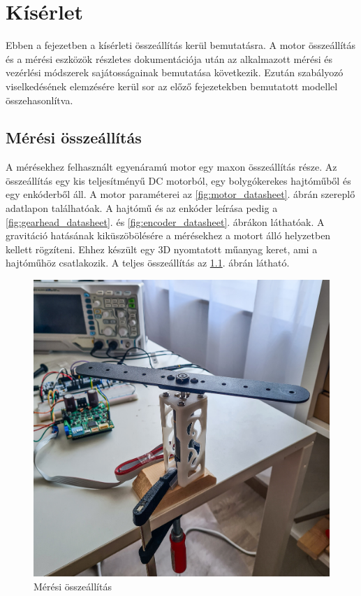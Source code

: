 \chapter{Kísérlet}\label{chap:experiment}

Ebben a fejezetben a kísérleti összeállítás kerül bemutatásra. A motor összeállítás és a mérési eszközök 
részletes dokumentációja után az alkalmazott mérési és vezérlési módszerek sajátosságainak bemutatása 
következik. Ezután szabályozó viselkedésének elemzésére kerül sor az előző fejezetekben bemutatott modellel 
összehasonlítva.

\section{Mérési összeállítás}
A mérésekhez felhasznált egyenáramú motor egy maxon összeállítás része. Az összeállítás egy 
kis teljesítményű DC motorból, egy bolygókerekes hajtóműből és egy enkóderből áll. A motor paraméterei
az \ref{fig:motor_datasheet}. ábrán szereplő adatlapon találhatóak. A hajtómű és az enkóder leírása pedig 
a \ref{fig:gearhead_datasheet}. és \ref{fig:encoder_datasheet}. ábrákon láthatóak. A gravitáció hatásának 
kiküszöbölésére a mérésekhez a motort álló helyzetben kellett rögzíteni. Ehhez készült egy 3D nyomtatott 
műanyag keret, ami a hajtóműhöz csatlakozik. A teljes összeállítás az \ref{fig:setup_experiment}. ábrán 
látható. 
\begin{figure}[H]
    \begin{center}
    \includegraphics[width=14cm]{images/setup_experiment.jpg}
    \caption{Mérési összeállítás}\label{fig:setup_experiment}
    \end{center}
\end{figure}
